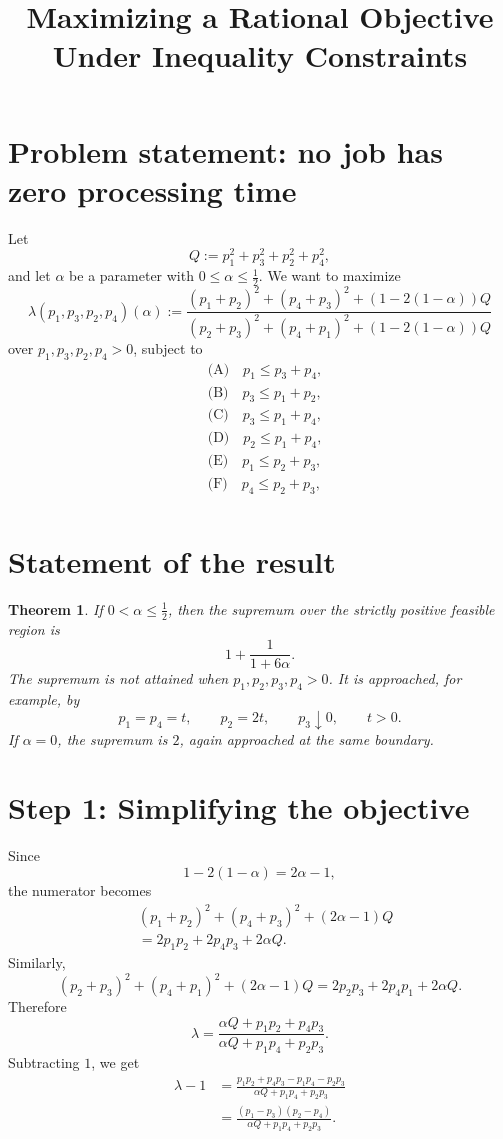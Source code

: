 \documentclass[11pt]{article}
\newtheorem{theorem}{Theorem}
\begin{document}
\title{Maximizing a Rational Objective Under Inequality Constraints}
\author{}
\date{}
\maketitle

\section*{Problem statement: no job has zero processing time}

Let
\[
Q := p_1^2+p_3^2+p_2^2+p_4^2,
\]
and let \(\alpha\) be a parameter with \(0 \le \alpha \le \tfrac12\).
We want to maximize
\[
\lambda(p_1,p_3,p_2,p_4)(\alpha)
:=
\frac{{(p_1+p_2)}^2+{(p_4+p_3)}^2+(1-2(1-\alpha))Q}{{(p_2+p_3)}^2+{(p_4+p_1)}^2+(1-2(1-\alpha))Q}
\]
over \(p_1,p_3,p_2,p_4 > 0\), subject to
\begin{align*}
&\text{(A)} \quad p_1 \le p_3+p_4,\\
&\text{(B)} \quad p_3 \le p_1+p_2,\\
&\text{(C)} \quad p_3 \le p_1+p_4,\\
&\text{(D)} \quad p_2 \le p_1+p_4,\\
&\text{(E)} \quad p_1 \le p_2+p_3,\\
&\text{(F)} \quad p_4 \le p_2+p_3,\\
\end{align*}

\section*{Statement of the result}

\begin{theorem}
If \(0<\alpha\le \tfrac12\), then the supremum over the strictly positive feasible region is
\[
\boxed{
1+\frac{1}{1+6\alpha}.
}
\]
The supremum is not attained when \(p_1,p_2,p_3,p_4>0\). It is approached, for example, by
\[
p_1=p_4=t,\qquad p_2=2t,\qquad p_3\downarrow 0,
\qquad t>0.
\]
If \(\alpha=0\), the supremum is \(2\), again approached at the same boundary.
\end{theorem}

\section*{Step 1: Simplifying the objective}

Since
\[
1-2(1-\alpha)=2\alpha-1,
\]
the numerator becomes
\begin{align*}
&{(p_1+p_2)}^2+{(p_4+p_3)}^2+(2\alpha-1)Q\\
&=2p_1p_2+2p_4p_3+2\alpha Q.
\end{align*}
Similarly,
\[
{(p_2+p_3)}^2+{(p_4+p_1)}^2+(2\alpha-1)Q
=2p_2p_3+2p_4p_1+2\alpha Q.
\]
Therefore
\[
\lambda
=
\frac{\alpha Q+p_1p_2+p_4p_3}{\alpha Q+p_1p_4+p_2p_3}.
\]
Subtracting \(1\), we get
\begin{align*}
\lambda-1
&=
\frac{p_1p_2+p_4p_3-p_1p_4-p_2p_3}
{\alpha Q+p_1p_4+p_2p_3}\\
&=
\frac{(p_1-p_3)(p_2-p_4)}
{\alpha Q+p_1p_4+p_2p_3}.
\end{align*}
\end{document}
